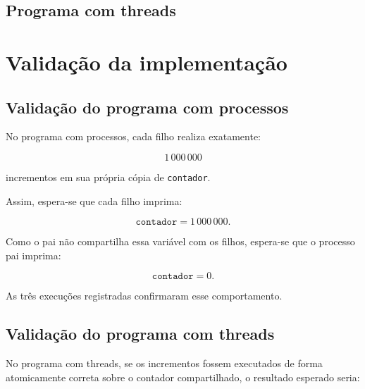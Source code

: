 

\subsection{Programa com threads}



\section{Validação da implementação}
\label{sec:atvd03-validacao}

\subsection{Validação do programa com processos}

No programa com processos, cada filho realiza exatamente:

\begin{equation}
    1\,000\,000
\end{equation}

incrementos em sua própria cópia de \texttt{contador}.

Assim, espera-se que cada filho imprima:

\begin{equation}
    \texttt{contador} = 1\,000\,000.
\end{equation}

Como o pai não compartilha essa variável com os filhos, espera-se que o processo pai imprima:

\begin{equation}
    \texttt{contador} = 0.
\end{equation}

As três execuções registradas confirmaram esse comportamento.

\subsection{Validação do programa com threads}

No programa com threads, se os incrementos fossem executados de forma atomicamente correta sobre o contador compartilhado, o resultado esperado seria:

